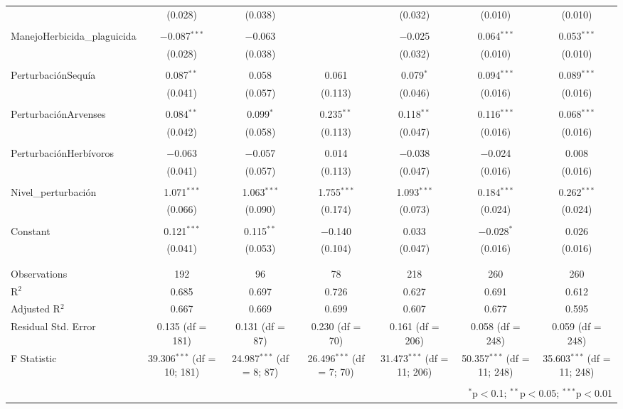 \documentclass[spanish,11pt]{article}
\begin{document}
\begin{table}[!htbp]
\begin{tabular}{@{\extracolsep{5pt}}lcccccc}
  & (0.028) & (0.038) &  & (0.032) & (0.010) & (0.010) \\ 
  & & & & & & \\ 
 ManejoHerbicida\_plaguicida & $-$0.087$^{***}$ & $-$0.063 &  & $-$0.025 & 0.064$^{***}$ & 0.053$^{***}$ \\ 
  & (0.028) & (0.038) &  & (0.032) & (0.010) & (0.010) \\ 
  & & & & & & \\ 
 PerturbaciónSequía & 0.087$^{**}$ & 0.058 & 0.061 & 0.079$^{*}$ & 0.094$^{***}$ & 0.089$^{***}$ \\ 
  & (0.041) & (0.057) & (0.113) & (0.046) & (0.016) & (0.016) \\ 
  & & & & & & \\ 
 PerturbaciónArvenses & 0.084$^{**}$ & 0.099$^{*}$ & 0.235$^{**}$ & 0.118$^{**}$ & 0.116$^{***}$ & 0.068$^{***}$ \\ 
  & (0.042) & (0.058) & (0.113) & (0.047) & (0.016) & (0.016) \\ 
  & & & & & & \\ 
 PerturbaciónHerbívoros & $-$0.063 & $-$0.057 & 0.014 & $-$0.038 & $-$0.024 & 0.008 \\ 
  & (0.041) & (0.057) & (0.113) & (0.047) & (0.016) & (0.016) \\ 
  & & & & & & \\ 
 Nivel\_perturbación & 1.071$^{***}$ & 1.063$^{***}$ & 1.755$^{***}$ & 1.093$^{***}$ & 0.184$^{***}$ & 0.262$^{***}$ \\ 
  & (0.066) & (0.090) & (0.174) & (0.073) & (0.024) & (0.024) \\ 
  & & & & & & \\ 
 Constant & 0.121$^{***}$ & 0.115$^{**}$ & $-$0.140 & 0.033 & $-$0.028$^{*}$ & 0.026 \\ 
  & (0.041) & (0.053) & (0.104) & (0.047) & (0.016) & (0.016) \\ 
  & & & & & & \\ 
\hline \\[-1.8ex] 
Observations & 192 & 96 & 78 & 218 & 260 & 260 \\ 
R$^{2}$ & 0.685 & 0.697 & 0.726 & 0.627 & 0.691 & 0.612 \\ 
Adjusted R$^{2}$ & 0.667 & 0.669 & 0.699 & 0.607 & 0.677 & 0.595 \\ 
Residual Std. Error & 0.135 (df = 181) & 0.131 (df = 87) & 0.230 (df = 70) & 0.161 (df = 206) & 0.058 (df = 248) & 0.059 (df = 248) \\ 
F Statistic & 39.306$^{***}$ (df = 10; 181) & 24.987$^{***}$ (df = 8; 87) & 26.496$^{***}$ (df = 7; 70) & 31.473$^{***}$ (df = 11; 206) & 50.357$^{***}$ (df = 11; 248) & 35.603$^{***}$ (df = 11; 248) \\ 
\hline 
\hline \\[-1.8ex] 
\multicolumn{7}{r}{$^{*}$p$<$0.1; $^{**}$p$<$0.05; $^{***}$p$<$0.01} \\ 
\end{tabular} 
\end{table} 
\end{document}
